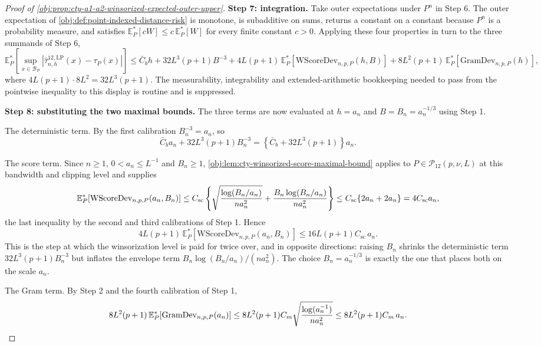 \documentclass[11pt]{article}
\begin{document}
\begin{proof}[Proof of \cref{obj:prop:cty-a1-a2-winsorized-expected-outer-upper}]
\textbf{Step 7: integration.}  Take outer expectations under \(P^n\) in Step 6.  The outer expectation of \cref{obj:def:point-indexed-distance-risk} is monotone, is subadditive on sums, returns a constant on a constant because \(P^n\) is a probability measure, and satisfies \(\mathbb E_P^*[cW]\leq c\,\mathbb E_P^*[W]\) for every finite constant \(c>0\).  Applying these four properties in turn to the three summands of Step 6,
\[
\mathbb E_P^*\!\left[\sup_{x\in\mathcal B_P}\left|\widehat\tau^{12,\mathrm{LP}}_{n,h}(x)-\tau_P(x)\right|\right]
\leq
\bar C_bh+32L^3(p+1)B^{-3}
+
4L(p+1)\,\mathbb E_P^*\!\left[\mathrm{WScoreDev}_{n,p,P}(h,B)\right]
+
8L^2(p+1)\,\mathbb E_P^*\!\left[\mathrm{GramDev}_{n,p,P}(h)\right] ,
\]
where \(4L(p+1)\cdot8L^2=32L^3(p+1)\).  The measurability, integrability and extended-arithmetic bookkeeping needed to pass from the pointwise inequality to this display is routine and is suppressed.

\textbf{Step 8: substituting the two maximal bounds.}  The three terms are now evaluated at \(h=a_n\) and \(B=B_n=a_n^{-1/3}\) using Step 1.

The deterministic term.  By the first calibration \(B_n^{-3}=a_n\), so
\[
\bar C_ba_n+32L^3(p+1)B_n^{-3}
=
\left\{\bar C_b+32L^3(p+1)\right\}a_n .
\]

The score term.  Since \(n\geq1\), \(0<a_n\leq L^{-1}\) and \(B_n\geq1\), \cref{obj:lem:cty-winsorized-score-maximal-bound} applies to \(P\in\mathcal P_{12}(p,\nu,L)\) at this bandwidth and clipping level and supplies
\[
\mathbb E_P^*\!\left[\mathrm{WScoreDev}_{n,p,P}(a_n,B_n)\right]
\leq
C_{\mathrm{sc}}\left\{
\sqrt{\log(B_n/a_n)\over na_n^2}
+
{B_n\log(B_n/a_n)\over na_n^2}
\right\}
\leq
C_{\mathrm{sc}}\{2a_n+2a_n\}
=
4C_{\mathrm{sc}}a_n ,
\]
the last inequality by the second and third calibrations of Step 1.  Hence
\[
4L(p+1)\,\mathbb E_P^*\!\left[\mathrm{WScoreDev}_{n,p,P}(a_n,B_n)\right]
\leq
16L(p+1)C_{\mathrm{sc}}\,a_n .
\]
This is the step at which the winsorization level is paid for twice over, and in opposite directions: raising \(B_n\) shrinks the deterministic term \(32L^3(p+1)B_n^{-3}\) but inflates the envelope term \(B_n\log(B_n/a_n)/(na_n^2)\).  The choice \(B_n=a_n^{-1/3}\) is exactly the one that places both on the scale \(a_n\).

The Gram term.  By Step 2 and the fourth calibration of Step 1,
\[
8L^2(p+1)\,\mathbb E_P^*\!\left[\mathrm{GramDev}_{n,p,P}(a_n)\right]
\leq
8L^2(p+1)C_m\sqrt{\log(a_n^{-1})\over na_n^2}
\leq
8L^2(p+1)C_m\,a_n .
\]


\end{proof}
\end{document}
